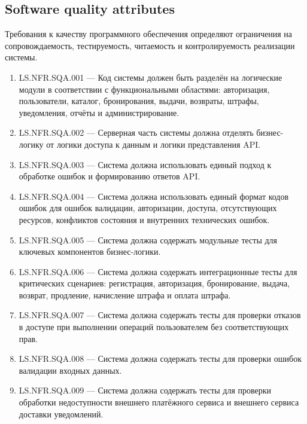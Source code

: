\documentclass[12pt,a4paper]{article}
\begin{document}
	\subsection{Software quality attributes}
	
	Требования к качеству программного обеспечения определяют ограничения
	на сопровождаемость, тестируемость, читаемость и контролируемость реализации
	системы.
	
	\begin{enumerate}
		\item LS.NFR.SQA.001 --- Код системы должен быть разделён на логические модули
		в соответствии с функциональными областями: авторизация, пользователи, каталог,
		бронирования, выдачи, возвраты, штрафы, уведомления, отчёты и администрирование.
		
		\item LS.NFR.SQA.002 --- Серверная часть системы должна отделять бизнес-логику
		от логики доступа к данным и логики представления API.
		
		\item LS.NFR.SQA.003 --- Система должна использовать единый подход к обработке
		ошибок и формированию ответов API.
		
		\item LS.NFR.SQA.004 --- Система должна использовать единый формат кодов ошибок
		для ошибок валидации, авторизации, доступа, отсутствующих ресурсов, конфликтов
		состояния и внутренних технических ошибок.
		
		\item LS.NFR.SQA.005 --- Система должна содержать модульные тесты для ключевых
		компонентов бизнес-логики.
		
		\item LS.NFR.SQA.006 --- Система должна содержать интеграционные тесты для
		критических сценариев: регистрация, авторизация, бронирование, выдача, возврат,
		продление, начисление штрафа и оплата штрафа.
		
		\item LS.NFR.SQA.007 --- Система должна содержать тесты для проверки отказов
		в доступе при выполнении операций пользователем без соответствующих прав.
		
		\item LS.NFR.SQA.008 --- Система должна содержать тесты для проверки ошибок
		валидации входных данных.
		
		\item LS.NFR.SQA.009 --- Система должна содержать тесты для проверки обработки
		недоступности внешнего платёжного сервиса и внешнего сервиса доставки
		уведомлений.
		

\end{enumerate}
\end{document}
